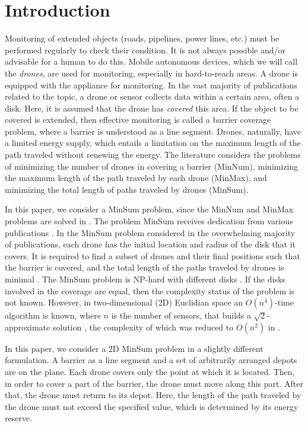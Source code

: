 \documentclass[runningheads]{llncs}
\begin{document}
\section{Introduction}
Monitoring of extended objects (roads, pipelines, power lines, etc.) must be performed regularly to check their condition. It is not always possible and/or advisable for a human to do this. Mobile autonomous devices, which we will call the \emph{drones}, are used for monitoring, especially in hard-to-reach areas. A drone is equipped with the appliance for monitoring. In the vast majority of publications related to the topic, a drone or sensor collects data within a certain area, often a disk. Here, it is assumed that the drone has \emph{covered} this area. If the object to be covered is extended, then effective monitoring is called a barrier coverage problem, where a barrier is understood as a line segment. Drones, naturally, have a limited energy supply, which entails a limitation on the maximum length of the path traveled without renewing the energy. The literature considers the problems of minimizing the number of drones in covering a barrier (MinNum), minimizing the maximum length of the path traveled by each drone (MinMax), and minimizing the total length of paths traveled by drones (MinSum).

In this paper, we consider a MinSum problem, since the MinNum and MinMax problems are solved in \cite{ErShad24}. The problem MinSum receives dedication from various publications \cite{Andrews:17,Bar:15,Benk:15,Cherry:17,Czyzowicz:10,Er:18,Err:18,Wang:15}. In the MinSum problem considered in the overwhelming majority of publications, each drone has the initial location and radius of the disk that it covers. It is required to find a subset of drones and their final positions such that the barrier is covered, and the total length of the paths traveled by drones is minimal \cite{Bhattacharya:09,Cherry:17,Czyzowicz:10,Dobrev:15,Er:18,ErLagIr:19}. The MinSum problem is NP-hard with different disks \cite{Czyzowicz:10,Dobrev:15}. If the disks involved in the coverage are equal, then the complexity status of the problem is not known. However, in two-dimensional (2D) Euclidian space an $O(n^4)$-time algorithm is known, where $n$ is the number of sensors, that builds a $\sqrt{2}$-approximate solution \cite{Cherry:17}, the complexity of which was reduced to $O(n^2)$ in \cite{Er:18}.

In this paper, we consider a 2D MinSum problem in a slightly different formulation. A barrier as a line segment and a set of arbitrarily arranged depots are on the plane. Each drone covers only the point at which it is located. Then, in order to cover a part of the barrier, the drone must move along this part. After that, the drone must return to its depot. Here, the length of the path traveled by the drone must not exceed the specified value, which is determined by its energy reserve.
\end{document}

